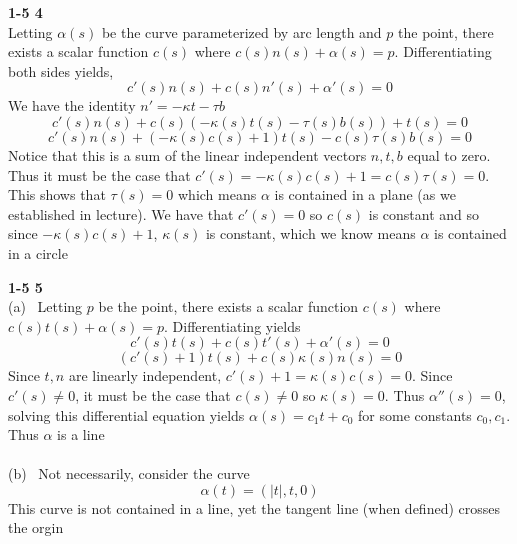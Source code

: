 \documentclass[12pt]{article}
\newenvironment{ques}[1]{\textbf{#1}\vspace{1 mm}\\ }{\bigskip}
\theoremstyle{definition}
\renewcommand{\a}{\alpha}
\begin{document}
\begin{ques}{1-5 4}
	Letting $\a(s)$ be the curve parameterized by arc length and $p$ the point,
	there exists a scalar function $c(s)$ where $c(s)n(s) + \a(s) = p$.
	Differentiating both sides yields, 
	$$c'(s)n(s) + c(s)n'(s) + \a'(s) = 0$$
	We have the identity $n' = -\kappa t - \tau b$
	$$c'(s)n(s) + c(s)(-\kappa(s) t(s) - \tau(s) b(s)) + t(s) = 0$$
	$$c'(s)n(s) + (-\kappa(s)c(s) + 1) t(s) - c(s)\tau(s) b(s) = 0$$
	Notice that this is a sum of the linear independent vectors $n, t, b$ equal
	to zero. Thus it must be the case that $c'(s) = - \kappa(s)c(s) + 1 =
	c(s)\tau(s) = 0$. This shows that $\tau(s) = 0$ which  means $\a$ is
	contained in a plane (as we established in lecture). We have that $c'(s) =
	0$ so $c(s)$ is constant and so since $-\kappa(s)c(s) + 1$, $\kappa(s)$ is
	constant, which we know means $\a$ is contained in a circle
\end{ques}

\begin{ques}{1-5 5}
	(a) \ Letting $p$ be the point, there exists a scalar function $c(s)$ where
	$c(s)t(s) + \a(s) = p$. Differentiating yields 
	$$c'(s)t(s) + c(s)t'(s) + \a'(s) = 0$$
	$$(c'(s) + 1)t(s) +  c(s)\kappa(s)n(s) = 0$$
	Since $t,n$ are linearly independent, $c'(s) + 1 = \kappa(s)c(s) = 0$.
	Since $c'(s) \neq 0 $, it must be the case that $c(s) \neq 0$ so $\kappa(s)
	= 0$. Thus $\a''(s) = 0$, solving this differential equation yields $\a(s)
	= c_1t + c_0$ for some constants $c_0, c_1$. Thus $\a$ is a line\\
	\\
	(b) \ Not necessarily, consider the curve
	$$\a(t) = (|t|, t, 0)$$
	This curve is not contained in a line, yet the tangent line (when defined)
	crosses the orgin
\end{ques}
\end{document}
